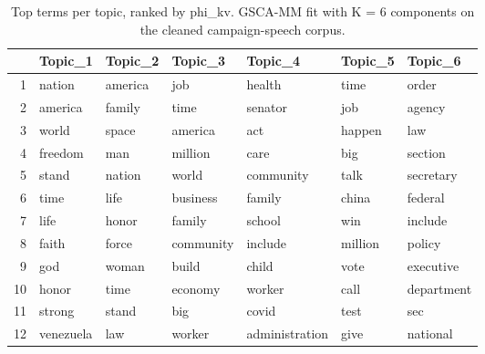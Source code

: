 \begin{table}[ht]
\centering
\begin{tabular}{rllllll}
  \toprule
 & Topic\_1 & Topic\_2 & Topic\_3 & Topic\_4 & Topic\_5 & Topic\_6 \\ 
  \midrule
1 & nation & america & job & health & time & order \\ 
  2 & america & family & time & senator & job & agency \\ 
  3 & world & space & america & act & happen & law \\ 
  4 & freedom & man & million & care & big & section \\ 
  5 & stand & nation & world & community & talk & secretary \\ 
  6 & time & life & business & family & china & federal \\ 
  7 & life & honor & family & school & win & include \\ 
  8 & faith & force & community & include & million & policy \\ 
  9 & god & woman & build & child & vote & executive \\ 
  10 & honor & time & economy & worker & call & department \\ 
  11 & strong & stand & big & covid & test & sec \\ 
  12 & venezuela & law & worker & administration & give & national \\ 
   \bottomrule
\end{tabular}
\caption{Top terms per topic, ranked by phi_kv. GSCA-MM fit with K = 6 components on the cleaned campaign-speech corpus.} 
\label{tab:topic-terms}
\end{table}
